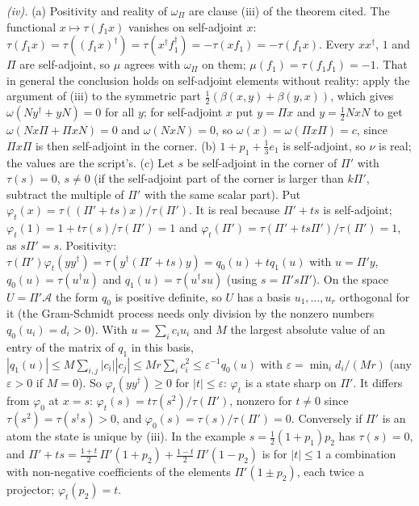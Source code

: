 \emph{(iv).} (a) Positivity and reality of $\omega_{\Pi}$ are clause (iii) of the theorem cited. The functional $x \mapsto \tau(f_{1}x)$ vanishes on self-adjoint $x$: $\tau(f_{1}x) = \tau((f_{1}x)^{\dagger}) = \tau(x^{\dagger}f_{1}^{\dagger}) = -\tau(xf_{1}) = -\tau(f_{1}x)$. Every $xx^{\dagger}$, $1$ and $\Pi$ are self-adjoint, so $\mu$ agrees with $\omega_{\Pi}$ on them; $\mu(f_{1}) = \tau(f_{1}f_{1}) = -1$. That in general the conclusion holds on self-adjoint elements without reality: apply the argument of (iii) to the symmetric part $\tfrac12(\beta(x,y) + \beta(y,x))$, which gives $\omega(Ny^{\dagger} + yN) = 0$ for all $y$; for self-adjoint $x$ put $y = \Pi x$ and $y = \tfrac12 NxN$ to get $\omega(Nx\Pi + \Pi xN) = 0$ and $\omega(NxN) = 0$, so $\omega(x) = \omega(\Pi x\Pi) = c$, since $\Pi x\Pi$ is then self-adjoint in the corner. (b) $1 + p_{1} + \tfrac13 e_{1}$ is self-adjoint, so $\nu$ is real; the values are the script's. (c) Let $s$ be self-adjoint in the corner of $\Pi'$ with $\tau(s) = 0$, $s \ne 0$ (if the self-adjoint part of the corner is larger than $k\Pi'$, subtract the multiple of $\Pi'$ with the same scalar part). Put $\varphi_{t}(x) = \tau((\Pi' + ts)x)/\tau(\Pi')$. It is real because $\Pi' + ts$ is self-adjoint; $\varphi_{t}(1) = 1 + t\tau(s)/\tau(\Pi') = 1$ and $\varphi_{t}(\Pi') = \tau(\Pi' + ts\Pi')/\tau(\Pi') = 1$, as $s\Pi' = s$. Positivity: $\tau(\Pi')\varphi_{t}(yy^{\dagger}) = \tau(y^{\dagger}(\Pi' + ts)y) = q_{0}(u) + tq_{1}(u)$ with $u = \Pi'y$, $q_{0}(u) = \tau(u^{\dagger}u)$ and $q_{1}(u) = \tau(u^{\dagger}su)$ (using $s = \Pi's\Pi'$). On the space $U = \Pi'\mathcal{A}$ the form $q_{0}$ is positive definite, so $U$ has a basis $u_{1}, \dots, u_{r}$ orthogonal for it (the Gram-Schmidt process needs only division by the nonzero numbers $q_{0}(u_{i}) = d_{i} > 0$). With $u = \sum_{i}c_{i}u_{i}$ and $M$ the largest absolute value of an entry of the matrix of $q_{1}$ in this basis, $|q_{1}(u)| \le M\sum_{i,j}|c_{i}||c_{j}| \le Mr\sum_{i}c_{i}^{2} \le \varepsilon^{-1}q_{0}(u)$ with $\varepsilon = \min_{i}d_{i}/(Mr)$ (any $\varepsilon > 0$ if $M = 0$). So $\varphi_{t}(yy^{\dagger}) \ge 0$ for $|t| \le \varepsilon$: $\varphi_{t}$ is a state sharp on $\Pi'$. It differs from $\varphi_{0}$ at $x = s$: $\varphi_{t}(s) = t\tau(s^{2})/\tau(\Pi')$, nonzero for $t \ne 0$ since $\tau(s^{2}) = \tau(s^{\dagger}s) > 0$, and $\varphi_{0}(s) = \tau(s)/\tau(\Pi') = 0$. Conversely if $\Pi'$ is an atom the state is unique by (iii). In the example $s = \tfrac12(1 + p_{1})p_{2}$ has $\tau(s) = 0$, and $\Pi' + ts = \tfrac{1 + t}{2}\,\Pi'(1 + p_{2}) + \tfrac{1 - t}{2}\,\Pi'(1 - p_{2})$ is for $|t| \le 1$ a combination with non-negative coefficients of the elements $\Pi'(1 \pm p_{2})$, each twice a projector; $\varphi_{t}(p_{2}) = t$.
